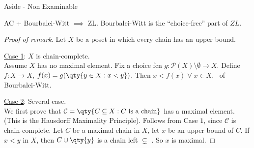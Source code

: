 \begin{aside}{Aside - Non Examinable}
    \begin{remark}
        AC + Bourbalei-Witt $\implies$ ZL. Bourbalei-Witt is the ``choice-free'' part of $ZL$.
    \end{remark}

    \begin{proof}[Proof of remark]
        Let $X$ be a poset in which every chain has an upper bound.

        \underline{Case 1}: $X$ is chain-complete. \\
        Assume $X$ has no maximal element.
        Fix a choice fcn $g : \mathcal{P}(X) \setminus \emptyset \to X$.
        Define $f : X \to X$, $f(x) = g(\qty{y \in X : x < y})$.
        Then $x < f(x) \; \forall \; x \in X$. \Lightning \ of Bourbalei-Witt.

        \underline{Case 2}: Several case. \\
        We first prove that $\mathcal{C} = \qty{C \subseteq X : C \text{ is a chain}}$ has a maximal element.
        (This is the Hausdorff Maximality Principle).
        Follows from Case $1$, since $\mathcal{C}$ is chain-complete.
        Let $C$ be a maximal chain in $X$, let $x$ be an upper bound of $C$.
        If $x < y$ in $X$, then $C \cup \qty{y}$ is a chain left $\subsetneq$ \Lightning.
        So $x$ is maximal.
    \end{proof}
\end{aside}